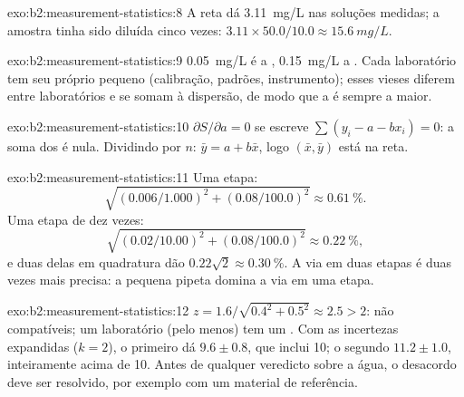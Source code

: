 \begin{solution}{exo:b2:measurement-statistics:8}
A reta dá \qty{3.11}{mg/L} nas soluções medidas; a amostra tinha sido diluída cinco vezes:
$3.11 \times 50.0/10.0 \approx \qty{15.6}{mg/L}$.
\end{solution}

\begin{solution}{exo:b2:measurement-statistics:9}
\qty{0.05}{mg/L} é a , \qty{0.15}{mg/L} a . Cada laboratório tem seu
próprio pequeno  (calibração, padrões, instrumento); esses vieses diferem entre laboratórios e se
somam à dispersão, de modo que a  é sempre a maior.
\end{solution}

\begin{solution}{exo:b2:measurement-statistics:10}
$\partial S/\partial a = 0$ se escreve $\sum(y_i - a - bx_i) = 0$: a soma dos  é nula. Dividindo por
$n$: $\bar y = a + b\bar x$, logo $(\bar x, \bar y)$ está na reta.
\end{solution}

\begin{solution}{exo:b2:measurement-statistics:11}
Uma etapa:
\[\sqrt{(0.006/1.000)^2 + (0.08/100.0)^2} \approx 0.61~\%.\]
Uma etapa de dez vezes:
\[\sqrt{(0.02/10.00)^2 + (0.08/100.0)^2} \approx 0.22~\%,\]
e duas delas em quadratura dão $0.22\sqrt2 \approx 0.30~\%$. A via em duas etapas é duas vezes mais precisa: a pequena pipeta domina a via em uma
etapa.
\end{solution}

\begin{solution}{exo:b2:measurement-statistics:12}
$z = 1.6/\sqrt{0.4^2 + 0.5^2} \approx 2.5 > 2$: não compatíveis; um laboratório (pelo menos) tem um .
Com as incertezas expandidas ($k = 2$), o primeiro dá $9.6 \pm 0.8$, que inclui 10; o segundo
$11.2 \pm 1.0$, inteiramente acima de 10. Antes de qualquer veredicto sobre a água, o desacordo deve ser
resolvido, por exemplo com um material de referência.
\end{solution}

